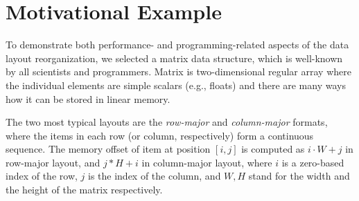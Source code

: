 \section{Motivational Example}\label{sec:motivation}

To demonstrate both performance- and programming-related aspects of the data layout reorganization, we selected a matrix data structure, which is well-known by all scientists and programmers. Matrix is two-dimensional regular array where the individual elements are simple scalars (e.g., floats) and there are many ways how it can be stored in linear memory.

The two most typical layouts are the \emph{row-major} and \emph{column-major} formats, where the items in each row (or column, respectively) form a continuous sequence. The memory offset of item at position $[i,j]$ is computed as $i\cdot W + j$ in row-major layout, and $j*H + i$ in column-major layout, where $i$ is a zero-based index of the row, $j$ is the index of the column, and $W,H$ stand for the width and the height of the matrix respectively.

